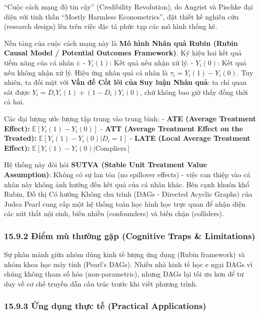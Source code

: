 \documentclass[
]{article}
\begin{document}
``Cuộc cách mạng độ tin cậy'' (Credibility Revolution), do Angrist và
Pischke đại diện với tinh thần ``Mostly Harmless Econometrics'', đặt
thiết kế nghiên cứu (research design) lên trên việc đặc tả phức tạp các
mô hình thống kê.

Nền tảng của cuộc cách mạng này là \textbf{Mô hình Nhân quả Rubin (Rubin
Causal Model / Potential Outcomes Framework)}. Ký hiệu hai kết quả tiềm
năng của cá nhân \(i\): - \(Y_i(1)\): Kết quả nếu nhận xử lý. -
\(Y_i(0)\): Kết quả nếu không nhận xử lý. Hiệu ứng nhân quả cá nhân là
\(\tau_i = Y_i(1) - Y_i(0)\). Tuy nhiên, ta đối mặt với \textbf{Vấn đề
Cốt lõi của Suy luận Nhân quả}: ta chỉ quan sát được
\(Y_i = D_i Y_i(1) + (1-D_i)Y_i(0)\), chứ không bao giờ thấy đồng thời
cả hai.

Các đại lượng ước lượng tập trung vào trung bình: - \textbf{ATE (Average
Treatment Effect):} \(\mathbb{E}[Y_i(1) - Y_i(0)]\) - \textbf{ATT
(Average Treatment Effect on the Treated):}
\(\mathbb{E}[Y_i(1) - Y_i(0) | D_i = 1]\) - \textbf{LATE (Local Average
Treatment Effect):} \(\mathbb{E}[Y_i(1) - Y_i(0) | \text{Compliers}]\)

Hệ thống này đòi hỏi \textbf{SUTVA (Stable Unit Treatment Value
Assumption)}: Không có sự lan tỏa (no spillover effects) - việc can
thiệp vào cá nhân này không ảnh hưởng đến kết quả của cá nhân khác. Bên
cạnh khuôn khổ Rubin, Đồ thị Có hướng Không chu trình (DAGs - Directed
Acyclic Graphs) của Judea Pearl cung cấp một hệ thống toán học hình học
trực quan để nhận diện các nút thắt nội sinh, biến nhiễu (confounders)
và biến chặn (colliders).

\subsubsection{15.9.2 Điểm mù thường gặp (Cognitive Traps \&
Limitations)}\label{ux111iux1ec3m-muxf9-thux1b0ux1eddng-gux1eb7p-cognitive-traps-limitations-105}

Sự phân mảnh giữa nhóm dùng kinh tế lượng ứng dụng (Rubin framework) và
nhóm khoa học máy tính (Pearl's DAGs). Nhiều nhà kinh tế học e ngại DAGs
vì chúng không tham số hóa (non-parametric), nhưng DAGs lại tối ưu hơn
để tư duy về cơ chế truyền dẫn cấu trúc trước khi viết phương trình.

\subsubsection{15.9.3 Ứng dụng thực tế (Practical
Applications)}\label{ux1ee9ng-dux1ee5ng-thux1ef1c-tux1ebf-practical-applications-61}
\end{document}
